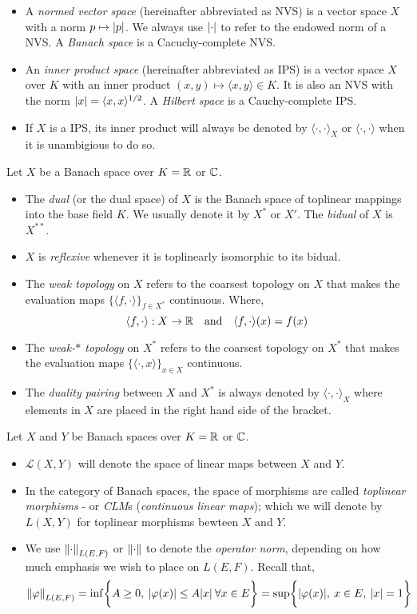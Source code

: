 \documentclass[../main-v2-manifolds.tex]{subfiles}
\begin{document}
\begin{itemize}
    \item A \emph{normed vector space} (hereinafter abbreviated as NVS) is a vector space $X$ with a norm $p\mapsto \vert {p} \vert$. We always use $\vert {\cdot} \vert$ to refer to the endowed norm of a NVS. A \emph{Banach space} is a Cacuchy-complete NVS.
    \item An \emph{inner product space} (hereinafter abbreviated as IPS) is a vector space $X$ over $K$ with an inner product $(x,y)\mapsto \langle x,y\rangle\in K$. It is also an NVS with the norm $\vert {x} \vert=\langle x,x\rangle^{1/2}$. A \emph{Hilbert space} is a Cauchy-complete IPS.
    \item If $X$ is a IPS, its inner product will always be denoted by $\langle \cdot,\cdot\rangle_{X}$ or $\langle \cdot,\cdot\rangle$ when it is unambigious to do so.
\end{itemize}
Let $X$ be a Banach space over $K = \mathbb{R}$ or ${\mathbb{C}}$.
\begin{itemize}
    \item The \emph{dual} (or the dual space) of $X$ is the Banach space of toplinear mappings into the base field $K$. We usually denote it by $X^*$ or $X'$. The \emph{bidual} of $X$ is $X^{**}$.
    \item $X$ is \emph{reflexive} whenever it is toplinearly isomorphic to its bidual.
    \item The \emph{weak topology} on $X$ refers to the coarsest topology on $X$ that makes the evaluation maps $\{\langle f,\cdot\rangle\}_{f\in X^*}$ continuous. Where,
    \[
        \langle f,\cdot\rangle: X\to\real\qqtext{and}\langle f,\cdot\rangle(x) = f(x)
    \]
    \item The \emph{weak-$\ast$ topology} on $X^*$ refers to the coarsest topology on $X^*$ that makes the evaluation maps $\{\langle\cdot, x\rangle\}_{x\in X}$ continuous.
    \item The \emph{duality pairing} between $X$ and $X^*$ is always denoted by $\langle \cdot,\cdot\rangle_{X}$ where elements in $X$ are placed in the right hand side of the bracket.
\end{itemize}
Let $X$ and $Y$ be Banach spaces over $K = \mathbb{R}$ or ${\mathbb{C}}$.
\begin{itemize}
    \item $\mathcal{L}(X,Y)$ will denote the space of linear maps between $X$ and $Y$. 
    \item In the category of Banach spaces, the space of morphisms are called \emph{toplinear morphisms} - or \emph{CLM}s (\emph{continuous linear maps}); which we will denote by $L(X,Y)$ for toplinear morphisms bewteen $X$ and $Y$.
    \item We use $\norm{\cdot}_{L(E,F)}$ or $\norm{\cdot}$ to denote the \emph{operator norm}, depending on how much emphasis we wish to place on $L(E,F)$. Recall that,
    \[\norm{\varphi}_{L(E,F)} = \inf\biggl\{{A\geq 0,\: \vert {\varphi(x)} \vert\leq A\vert {x} \vert\:\forall x\in E}\biggr\} = \sup\biggl\{{\vert {\varphi(x)} \vert,\: x\in E,\: \vert {x} \vert=1}\biggr\}\]
\end{itemize}
\end{document}
